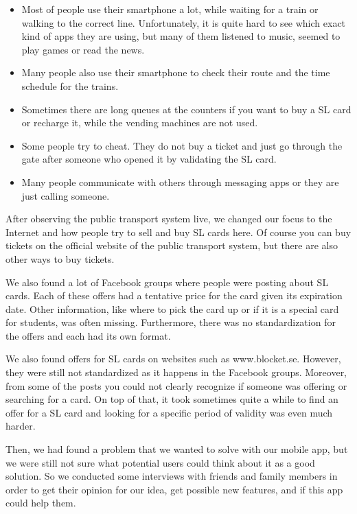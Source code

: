\documentclass[11pt,twoside,a4paper]{report}
\begin{document}
\begin{itemize}
\item Most of people use their smartphone a lot, while waiting for a train or walking to the correct line. Unfortunately, it is quite hard to see which exact kind of apps they are using, but many of them listened to music, seemed to play games or read the news.
\item Many people also use their smartphone to check their route and the time schedule for the trains.
\item Sometimes there are long queues at the counters if you want to buy a SL card or recharge it, while the vending machines are not used.
\item Some people try to cheat. They do not buy a ticket and just go through the gate after someone who opened it by validating the SL card.
\item Many people communicate with others through messaging apps or they are just calling someone.
\end{itemize}

After observing the public transport system live, we changed our focus to the Internet and how people try to sell and buy SL cards here. Of course you can buy tickets on the official website of the public transport system, but there are also other ways to buy tickets.

We also found a lot of Facebook groups where people were posting about SL cards. Each of these offers had a tentative price for the card given its expiration date. Other information, like where to pick the card up or if it is a special card for students, was often missing. Furthermore, there was no standardization for the offers and each had its own format.

We also found offers for SL cards on websites such as www.blocket.se. However, they were still not standardized as it happens in the Facebook groups. Moreover, from some of the posts you could not clearly recognize if someone was offering or searching for a card. On top of that, it took sometimes quite a while to find an offer for a SL card and looking for a specific period of validity was even much harder.

Then, we had found a problem that we wanted to solve with our mobile app, but we were still not sure what potential users could think about it as a good solution. So we conducted some interviews with friends and family members in order to get their opinion for our idea, get possible new features, and if this app could help them.
\end{document}

